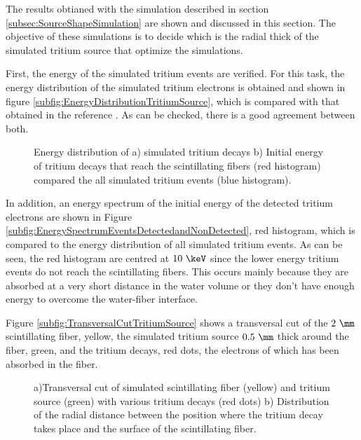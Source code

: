 The results obtianed with the simulation described in section \ref{subsec:SourceShapeSimulation} are shown and discussed in this section. The objective of these simulations is to decide which is the radial thick of the simulated tritium source that optimize the simulations. 

First, the energy of the simulated tritium events are verified. For this task, the energy distribution of the simulated tritium electrons is obtained and shown in figure \ref{subfig:EnergyDistributionTritiumSource}, which is compared with that obtained in the reference \cite{TritiumEmissionSpectrum}. As can be checked, there is a good agreement between both.

\begin{figure}[h]
 \centering
 \caption{ Energy distribution of a) simulated tritium decays b) Initial energy of tritium decays that reach the scintillating fibers (red histogram) compared the all simulated tritium events (blue histogram).}
 \label{fig:TritiumSourceOptimization}
\end{figure}

In addition, an energy spectrum of the initial energy of the detected tritium electrons are shown in Figure \ref{subfig:EnergySpectrumEventsDetectedandNonDetected}, red histogram, which is compared to the energy distribution of all simulated tritium events. As can be seen, the red histogram are centred at $10~\keV$ since the lower energy tritium events do not reach the scintillating fibers. This occurs mainly because they are absorbed at a very short distance in the water volume or they don't have enough energy to overcome the water-fiber interface.

Figure \ref{subfig:TransversalCutTritiumSource} shows a transversal cut of the $2~\mm$ scintillating fiber, yellow, the simulated tritium source $0.5~\mm$ thick around the fiber, green, and the tritium decays, red dots, the electrons of which has been absorbed in the fiber.

\begin{figure}[h]
 \centering
 \caption{a)Transversal cut of simulated scintillating fiber (yellow) and tritium source (green) with various tritium decays (red dots) b) Distribution of the radial distance between the position where the tritium decay takes place and the surface of the scintillating fiber.}
 \label{fig:TritiumSourceSimulated}
\end{figure}	

